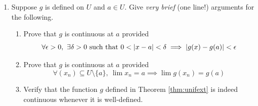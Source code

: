 \begin{exercises}{}{}
\begin{enumerate}
% 	  


		\item Suppose $g$ is defined on $U$ and $a\in U$. Give \emph{very brief} (one line!) arguments for the following.
		\begin{enumerate}
		  \item Prove that $g$ is continuous at $a$ provided
		  \[
		  	\forall \epsilon>0,\ \exists \delta>0
		  	\text{ such that }
		  	0<\left| x-a\right|<\delta\implies\left| g(x)-g(a)\right|<\epsilon
		  \]
		  
		  \item Prove that $g$ is continuous at $a$ provided
		  \[
		  	\forall (x_n)\subseteq U\setminus\{a\},\ \lim x_n=a\implies \lim g(x_n)=g(a)
		  \]
		  
		  \item Verify that the function $g$ defined in Theorem \ref{thm:unifext} is indeed continuous whenever it is well-defined.
		\end{enumerate}



\end{enumerate}
\end{exercises}
